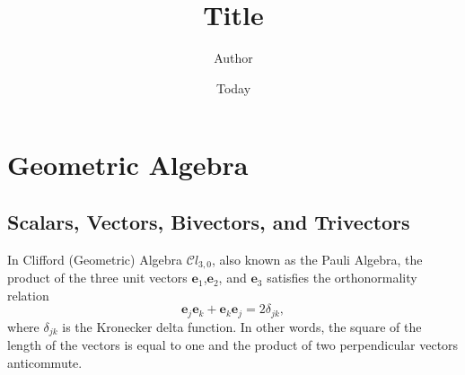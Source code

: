 \documentclass[twocolumn,showpacs,preprintnumbers,amsmath,amssymb]{revtex4}
\begin{document}
\title{Title}
\author{Author}
\date{Today}
\maketitle


\section{Geometric Algebra}


\subsection{Scalars, Vectors, Bivectors, and Trivectors}

In Clifford (Geometric) Algebra $\mathcal Cl_{3,0}$, also known as the Pauli Algebra, the product of the three unit vectors $\mathbf{e}_1$,$\mathbf{e}_2$, and $\mathbf{e}_3$ satisfies the orthonormality relation \cite{vold, hestenesoersted, geomaloptics}
\begin{equation} 
\label{eq:orthonormality}
\mathbf e_j \mathbf e_k + \mathbf e_k \mathbf e_j = 2 \delta_{jk},
\end{equation}
where $\delta_{jk}$ is the Kronecker delta function. 
In other words, the square of the length of the vectors is equal to one and the product of two perpendicular vectors anticommute.
\end{document}
